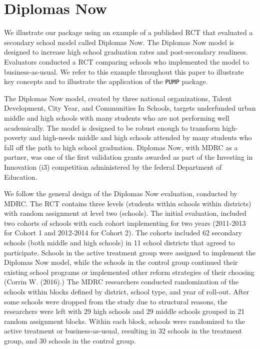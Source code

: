 \documentclass[
]{article}
\begin{document}
\section{Diplomas Now}
\label{sec:diplomas}

We illustrate our package using an example of a published RCT that
evaluated a secondary school model called Diplomas Now. The Diplomas Now
model is designed to increase high school graduation rates and
post-secondary readiness. Evaluators conducted a RCT comparing schools
who implemented the model to business-as-usual. We refer to this example
throughout this paper to illustrate key concepts and to illustrate the
application of the \texttt{PUMP} package.

The Diplomas Now model, created by three national organizations, Talent
Development, City Year, and Communities In Schools, targets underfunded
urban middle and high schools with many students who are not performing
well academically. The model is designed to be robust enough to
transform high-poverty and high-needs middle and high schools attended
by many students who fall off the path to high school graduation.
Diplomas Now, with MDRC as a partner, was one of the first validation
grants awarded as part of the Investing in Innovation (i3) competition
administered by the federal Department of Education.

We follow the general design of the Diplomas Now evaluation, conducted
by MDRC. The RCT contains three levels (students within schools within
districts) with random assignment at level two (schools). The initial
evaluation, included two cohorts of schools with each cohort
implementing for two years (2011-2013 for Cohort 1 and 2012-2014 for
Cohort 2). The cohorts included 62 secondary schools (both middle and
high schools) in 11 school districts that agreed to participate. Schools
in the active treatment group were assigned to implement the Diplomas
Now model, while the schools in the control group continued their
existing school programs or implemented other reform strategies of their
choosing (Corrin W. (2016).) The MDRC researchers conducted
randomization of the schools within blocks defined by district, school
type, and year of roll-out. After some schools were dropped from the
study due to structural reasons, the researchers were left with 29 high
schools and 29 middle schools grouped in 21 random assignment blocks.
Within each block, schools were randomized to the active treatment or
business-as-usual, resulting in 32 schools in the treatment group, and
30 schools in the control group.
\end{document}
